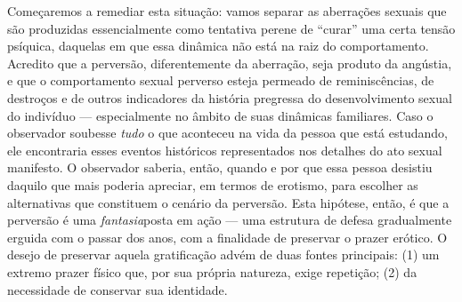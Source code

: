 Começaremos a remediar esta situação:\idxlibid{} vamos separar as aberrações
sexuais que são produzidas essencialmente como tentativa perene de
``curar'' uma certa tensão psíquica, daquelas
em que essa dinâmica não está na raiz do comportamento. Acredito que a
perversão, diferentemente da aberração, seja produto da angústia,\idxangu{} e que
o comportamento sexual perverso esteja permeado de reminiscências, de
destroços e de outros indicadores da história pregressa do
desenvolvimento sexual do indivíduo --- especialmente no âmbito de suas
dinâmicas familiares.\idxinflu{} Caso o observador soubesse \textit{tudo} o que
aconteceu na vida da pessoa que está estudando, ele encontraria esses
eventos históricos representados nos detalhes do ato sexual manifesto.
O observador saberia, então, quando e por que essa pessoa desistiu
daquilo que mais poderia apreciar, em termos de erotismo, para escolher
as alternativas que constituem o cenário da perversão. Esta hipótese,
então, é que a perversão é uma \textit{fantasia}\idxfanta[|(] posta em ação --- uma
estrutura de defesa gradualmente erguida com o passar dos anos, com a
finalidade de preservar o prazer erótico. O desejo de preservar aquela
gratificação advém de duas fontes principais: (1) um extremo prazer
físico que, por sua própria natureza, exige repetição; (2) da
necessidade de conservar sua identidade.

